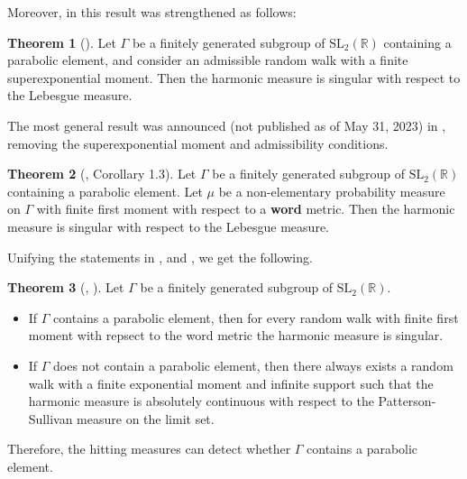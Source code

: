 \documentclass[11pt]{amsart}
\theoremstyle{definition}
\newtheorem{theorem}{Theorem}[section]
\begin{document}
	Moreover, in \cite{MR4069238} this result was strengthened as follows:
	
	\begin{theorem}[\cite{MR4069238}]
		Let $\Gamma$ be a finitely generated subgroup of $\text{SL}_2(\mathbb{R})$ containing a parabolic element, and consider an admissible random walk with a finite superexponential moment. Then the harmonic measure is singular with respect to the Lebesgue measure.
	\end{theorem}
	
	The most general result was announced (not published as of May 31, 2023) in \cite{benard2023winding}, removing the superexponential moment and admissibility conditions. 
	
	\begin{theorem}[\cite{benard2023winding}, Corollary 1.3]
		Let $\Gamma$ be a finitely generated subgroup of $\text{SL}_2(\mathbb{R})$ containing a parabolic element. Let $\mu$ be a non-elementary probability measure on $\Gamma$ with finite first moment with respect to a \textbf{word} metric. Then the harmonic measure is singular with respect to the Lebesgue measure.
	\end{theorem}
	
	Unifying the statements in \cite{linaudpan}, \cite{benard2023winding} and , we get the following.
	
	\begin{theorem}[\cite{linaudpan}, \cite{benard2023winding}]
		Let $\Gamma$ be a finitely generated subgroup of $\text{SL}_2(\mathbb{R})$.
		\begin{itemize}
			\item If $\Gamma$ contains a parabolic element, then for every random walk with finite first moment with repsect to the word metric the harmonic measure is singular.
			\item If $\Gamma$ does not contain a parabolic element, then there always exists a random walk with a finite exponential moment and infinite support such that the harmonic measure is absolutely continuous with respect to the Patterson-Sullivan measure on the limit set.
		\end{itemize}
	\end{theorem}
	
	Therefore, the hitting measures can detect whether $\Gamma$ contains a parabolic element.
	
\end{document}
